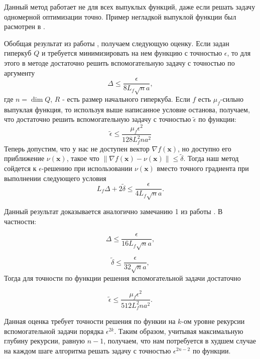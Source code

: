 \documentclass[12pt]{article}
\begin{document}
Данный метод работает не для всех выпуклых функций, даже если решать задачу одномерной оптимизации точно. Пример негладкой выпуклой функции был расмотрен в \cite{Ston_Pas}.

Обобщая результат из  работы \cite{Ston_Pas}, получаем следующую оценку. Если задан гиперкуб $Q$ и требуется минимизировать на нем функцию с точностью $\epsilon$, то для этого в методе достаточно решить вспомогательную задачу с точностью по аргументу
\begin{equation}
    \label{ConstEst}
    \Delta \leq \frac{\epsilon}{8L_f \sqrt{n}a},
\end{equation}
где $n=\dim Q$, $R$ - есть размер начального гиперкуба. Если $f$ есть $\mu_f$-сильно выпуклая функция, то используя выше написанное условие останова, получаем, что достаточно решить вспомогательную задачу с точностью $\tilde{\epsilon}$ по функции:
\begin{equation}
    \label{ConstEstFunc}
    \tilde{\epsilon} \leq \frac{\mu_f \epsilon^2}{128 L_f^2 n a^2}
\end{equation}
Теперь допустим, что у нас не доступен вектор $\nabla f(\textbf{x})$, но доступно его приближение $\nu(\textbf{x})$, такое что $\|\nabla f(\textbf{x})-\nu(\textbf{x})\|\leq \tilde{\delta}$. Тогда наш метод сойдется к $\epsilon$-решению при использовании $\nu(\textbf{x})$ вместо точного градиента при выполнении следующего условия
\begin{equation}
    L_f \Delta +  2\tilde{\delta}\leq \frac{\epsilon}{4L_f \sqrt{n}a}.
\end{equation}

Данный результат доказывается аналогично замечанию 1 из работы \cite{Ston_Pas}. В частности:

\begin{equation}
    \Delta \leq \frac{\epsilon}{16L_f \sqrt{n}a},
\end{equation}

\begin{equation}
	\label{InexGradConst}
    \tilde{\delta} \leq \frac{\epsilon}{32\sqrt{n}a},
\end{equation}
Тогда для точности по функции решения вспомогательной задачи достаточно

\begin{equation}
    \tilde{\epsilon} \leq \frac{\mu_f \epsilon^2}{512 L_f^2 n a^2}.
\end{equation}


Данная оценка требует точности решения по функии на $k$-ом уровне рекурсии вспомогательной задачи порядка $\epsilon^{2k}$. Таким образом, учитывая максимальную глубину рекурсии, равную $n-1$, получаем, что нам потребуется в худшем случае на каждом шаге алгоритма решать задачу с точностью $\epsilon^{2n-2}$ по функции.
\end{document}
